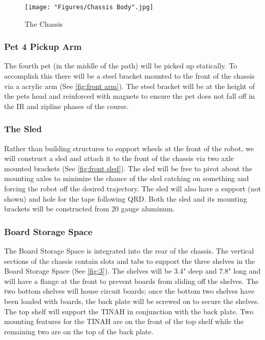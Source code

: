 \documentclass[11pt, oneside]{article} %
\begin{document}
	\begin{figure}[h]
		\centering
		\texttt{[image: "Figures/Chassis Body".jpg]}
		\caption[Chassis]{The Chassis}
		\label{fig:1}
	\end{figure}

		\subsubsection{Pet 4 Pickup Arm}
		The fourth pet (in the middle of the path) will be picked up statically. To accomplish this there will be a steel bracket mounted to the front of the chassis via a acrylic arm (See \autoref{fig:front arm}). The steel bracket will be at the height of the pets head and reinforced with magnets to ensure the pet does not fall off in the IR and zipline phases of the course.
	
		\subsubsection{The Sled}
		Rather than building structures to support wheels at the front of the robot, we will construct a sled and attach it to the front of the chassis via two axle mounted brackets (See \autoref{fig:front sled}). The sled will be free to pivot about the mounting axles to minimize the chance of the sled catching on something and forcing the robot off the desired trajectory. The sled will also have a support (not shown) and hole for the tape following QRD. Both the sled and its mounting brackets will be constructed from 20 gauge aluminum.
		
		\subsubsection{Board Storage Space}

		The Board Storage Space is integrated into the rear of the chassis. The vertical sections of the chassis contain slots and tabs to support the three shelves in the Board Storage Space (See \autoref{fig:3}). The shelves will be 3.4" deep and 7.8" long and will have a flange at the front to prevent boards from sliding off the shelves. The two bottom shelves will house circuit boards; once the bottom two shelves have been loaded with boards, the back plate will be screwed on to secure the shelves. The top shelf will support the TINAH in conjunction with the back plate. Two mounting features for the TINAH are on the front of the top shelf while the remaining two are on the top of the back plate.
		
\end{document}
